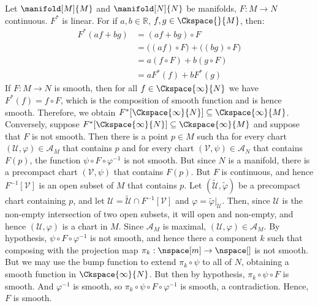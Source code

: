 \documentclass{article}                                                        %
\begin{document}
        \begin{solution}
            Let $\manifold[M]{M}$ and $\manifold[N]{N}$ be manifolds,
            $F:M\rightarrow{N}$ continuous. $F^{*}$ is linear. For if
            $a,b\in\mathbb{R}$, $f,g\in\Ckspace{}{M}$, then:
            \begin{subequations}
                \begin{align}
                    F^{*}(af+bg)&=(af+bg)\circ{F}\\
                    &=\big((af)\circ{F}\big)+\big((bg)\circ{F}\big)\\
                    &=a(f\circ{F})+b(g\circ{F})\\
                    &=aF^{*}(f)+bF^{*}(g)
                \end{align}
            \end{subequations}
            If $F:M\rightarrow{N}$ is smooth, then for all
            $f\in\Ckspace{\infty}{N}$ we have $F^{*}(f)=f\circ{F}$, which is the
            composition of smooth function and is hence smooth. Therefore, we
            obtain $F^{*}[\Ckspace{\infty}{N}]\subseteq\Ckspace{\infty}{M}$.
            Conversely, suppose
            $F^{*}[\Ckspace{\infty}{N}]\subseteq\Ckspace{\infty}{M}$ and suppose
            that $F$ is not smooth. Then there is a point $p\in{M}$ such tha for
            every chart $(\mathcal{U},\varphi)\in\mathcal{A}_{M}$ that contains
            $p$ and for every chart $(\mathcal{V},\psi)\in\mathcal{A}_{N}$ that
            contains $F(p)$, the function $\psi\circ{F}\circ\varphi^{\minus{1}}$
            is not smooth. But since $N$ is a manifold, there is a precompact
            chart $(\mathcal{V},\psi)$ that contains $F(p)$. But $F$ is
            continuous, and hence $F^{\minus{1}}[\mathcal{V}]$ is an open subset
            of $M$ that contains $p$. Let
            $(\tilde{\mathcal{U}},\tilde{\varphi})$ be a precompact chart
            containing $p$, and let
            $\mathcal{U}=\tilde{\mathcal{U}}\cap{F}^{\minus{1}}[\mathcal{V}]$
            and $\varphi=\tilde{\varphi}|_{\mathcal{U}}$. Then, since
            $\mathcal{U}$ is the non-empty intersection of two open subsets,
            it will open and non-empty, and hence $(\mathcal{U},\varphi)$
            is a chart in $M$. Since $\mathcal{A}_{M}$ is maximal,
            $(\mathcal{U},\varphi)\in\mathcal{A}_{M}$. By hypothesis,
            $\psi\circ{F}\circ\varphi^{\minus{1}}$ is not smooth, and hence
            there a component $k$ such that composing with the projection map
            $\pi_{k}:\nspace[m]\rightarrow\nspace[]$ is not smooth. But we may
            use the bump function to extend $\pi_{k}\circ\psi$ to all of $N$,
            obtaining a smooth function in $\Ckspace{\infty}{N}$. But then by
            hypothesis, $\pi_{k}\circ\psi\circ{F}$ is smooth. And
            $\varphi^{\minus{1}}$ is smooth, so
            $\pi_{k}\circ\psi\circ{F}\circ\varphi^{\minus{1}}$ is smooth,
            a contradiction. Hence, $F$ is smooth.
        \end{solution}
\end{document}
